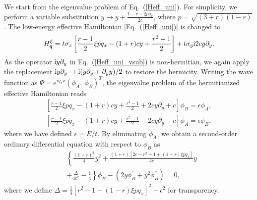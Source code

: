 \documentclass[aps, twocolumn, floatfix, superscriptaddress, prb]{revtex4-1}
\begin{document}
We start from the eigenvalue problem of Eq.~(\ref{Heff_uni}). For simplicity, we perform a variable substitution $y\rightarrow y+\frac{1-r-\xi pq_x}{2c}$, where $p=\sqrt{(3+r)(1-r)}$. The low-energy effective Hamiltonian [Eq.~(\ref{Heff_uni})] is changed to
%
\begin{equation}\label{Heff_uni_vsub}
{
H_{\bm q}^\xi = t\sigma_x\left[\frac{r-1}{2} \xi pq_x-(1+r)cy+\frac{r^2-1}{2}\right] + t\sigma_y {\rm i}2cy\partial_y.
}
\end{equation}
%
As the operator ${\rm i}y\partial_y$ in Eq.~(\ref{Heff_uni_vsub}) is non-hermitian, we again apply the replacement ${\rm i}y\partial_y\rightarrow {\rm i}(y\partial_y+\partial_yy)/2$ to restore the hermicity. Writing the wave function as $\Psi=e^{iq_xx}(\phi_A,\ \phi_B)^T$, the eigenvalue problem of the hermitianized effective Hamiltonian reads
%
%
%
%
%
\begin{equation}
\begin{split}
{
\left[\frac{r-1}{2} \xi p q_x-(1+r)cy + \frac{r^2-1}{2} +2cy\partial_y+c\right]\phi_B=\epsilon\phi_A,
}
\\
{
\left[\frac{r-1}{2} \xi pq_x-(1+r)cy+ \frac{r^2-1}{2} -2cy\partial_y-c\right]\phi_A=\epsilon\phi_B,
}
\end{split}
\end{equation}
%
where we have defined $\epsilon=E/t$. By eliminating $\phi_A$, we obtain a second-order ordinary differential equation with respect to $\phi_B$ as
%
%
\begin{align}\label{ode_uni}
&{\left\{\frac{(1+r)^2}{4}y^2 + \frac{(1+r)[2c-r^2+1 + (1-r) \xi pq_x]}{4c}y \right.} \nonumber
\\
&{\left.+\frac{\Delta}{4c^2}-\frac{1}{4} \right\}\phi_B -\left(2 y\phi^\prime_B+y^2 \phi_B^{\prime\prime}\right)=0},
\end{align}
%
where we define {$\Delta=\frac{1}{4}[r^2-1-(1-r)\xi pq_x]^2-\epsilon^2$} for transparency.
\end{document}
